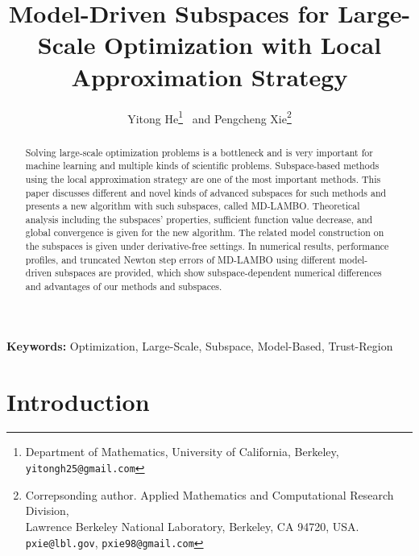 \documentclass[colorlinks=true, linkcolor=blue, citecolor=blue, urlcolor=blue]{article}
\title{Model-Driven Subspaces for Large-Scale Optimization with Local Approximation Strategy}
\author{Yitong He\orcidlink{0009-0000-1906-3528}\footnote{Department of Mathematics, University of California, Berkeley, \texttt{yitongh25@gmail.com}} \ and Pengcheng Xie\orcidlink{0000-0001-5973-1535}\footnote{Correpsonding author. Applied Mathematics and Computational Research Division,\\
    Lawrence Berkeley National Laboratory, Berkeley, CA 94720, USA. \texttt{pxie@lbl.gov}, \texttt{pxie98@gmail.com}}}
\theoremstyle{plain}
\theoremstyle{definition}
\theoremstyle{remark}
\begin{document}
\maketitle

\begin{abstract}
Solving large-scale optimization problems is a bottleneck and is very important for machine learning and multiple kinds of scientific problems. Subspace-based methods using the local approximation strategy are one of the most important methods. This paper discusses different and novel kinds of advanced subspaces for such methods and presents a new algorithm with such subspaces, called MD-LAMBO. Theoretical analysis including the subspaces' properties, sufficient function value decrease, and global convergence is given for the new algorithm. The related model construction on the subspaces is given under derivative-free settings. In numerical results, performance profiles, and truncated Newton step errors of MD-LAMBO using different model-driven subspaces are provided, which show subspace-dependent numerical differences and advantages of our methods and subspaces.
\end{abstract}

{\bf Keywords:} Optimization, Large-Scale, Subspace, Model-Based, Trust-Region

\section{Introduction}
\end{document}
